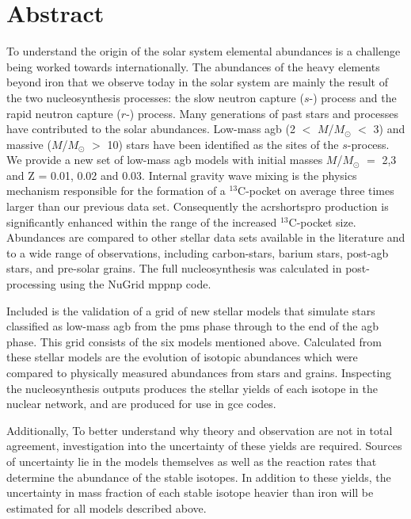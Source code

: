 \chapter{Abstract}

To understand the origin of the solar system elemental abundances is a challenge being worked towards internationally. The abundances of the heavy elements beyond iron that we observe today in the solar system are mainly the result of the two nucleosynthesis processes: the slow neutron capture ($s$-) process and the rapid neutron capture ($r$-) process. Many generations of past stars and processes have contributed to the solar abundances. Low-mass \acrfull{agb} (2 $<$ $M$/$M_\odot$ $<$ 3) and massive ($M$/$M_\odot$ $>$ 10) stars have been identified as the sites of the $s$-process. We provide a new set of low-mass \acrshort{agb} models with initial masses $M$/$M_\odot$ $=$ 2,3 and Z = 0.01, 0.02 and 0.03. Internal gravity wave mixing is the physics mechanism responsible for the formation of a $^{13}$C-pocket on average three times larger than our previous data set. Consequently the acrshort{spro} production is significantly enhanced within the range of the increased $^{13}$C-pocket size. Abundances are compared to other stellar data sets available in the literature and to a wide range of observations, including carbon-stars, barium stars, post-\acrshort{agb} stars, and pre-solar grains. The full nucleosynthesis was calculated in post-processing using the NuGrid mppnp code.

Included is the validation of a grid of new stellar models that simulate stars classified as low-mass \acrshort{agb} from the \acrlong{pms} phase through to the end of the \acrshort{agb} phase. This grid consists of the six models mentioned above. Calculated from these stellar models are the evolution of isotopic abundances which were compared to physically measured abundances from stars and grains. Inspecting the nucleosynthesis outputs produces the stellar yields of each isotope in the nuclear network, and are produced for use in \acrfull{gce} codes. 

Additionally, To better understand why theory and observation are not in total agreement, investigation into the uncertainty of these yields are required. Sources of uncertainty lie in the models themselves as well as the reaction rates that determine the abundance of the stable isotopes. In addition to these yields, the uncertainty in mass fraction of each stable isotope heavier than iron will be estimated for all models described above.  
